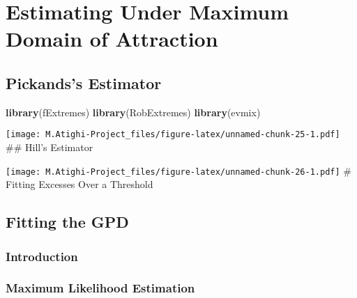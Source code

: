 \documentclass[
  12pt,
]{article}
\newenvironment{Shaded}{\begin{snugshade}}{\end{snugshade}}
\newcommand{\FunctionTok}[1]{\textcolor[rgb]{0.13,0.29,0.53}{\textbf{#1}}}
\newcommand{\NormalTok}[1]{#1}
\newcommand{\SpecialCharTok}[1]{\textcolor[rgb]{0.81,0.36,0.00}{\textbf{#1}}}
\begin{document}
\section{Estimating Under Maximum Domain of
Attraction}\label{estimating-under-maximum-domain-of-attraction}

\subsection{Pickands's Estimator}\label{pickandss-estimator}

\begin{Shaded}
\begin{Highlighting}[]
\FunctionTok{library}\NormalTok{(fExtremes)}
\FunctionTok{library}\NormalTok{(RobExtremes)}
\FunctionTok{library}\NormalTok{(evmix)}
\end{Highlighting}
\end{Shaded}

\begin{Shaded}
\end{Shaded}

\texttt{[image: M.Atighi-Project\_files/figure-latex/unnamed-chunk-25-1.pdf]}
\#\# Hill's Estimator

\begin{Shaded}
\end{Shaded}

\texttt{[image: M.Atighi-Project\_files/figure-latex/unnamed-chunk-26-1.pdf]}
\# Fitting Excesses Over a Threshold

\subsection{Fitting the GPD}\label{fitting-the-gpd}

\subsubsection{Introduction}\label{introduction-4}

\subsubsection{Maximum Likelihood
Estimation}\label{maximum-likelihood-estimation-1}
\end{document}

